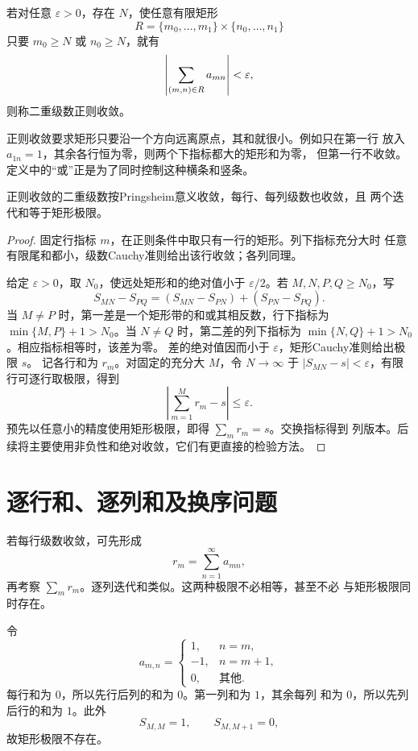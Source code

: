 \begin{definition}[正则收敛]
\label{def:double-series-regular}
若对任意 \(\varepsilon>0\)，存在 \(N\)，使任意有限矩形
\[
 R=\{m_0,\ldots,m_1\}\times\{n_0,\ldots,n_1\}
\]
只要 \(m_0\ge N\) 或 \(n_0\ge N\)，就有
\[
 \left|\sum_{(m,n)\in R}a_{mn}\right|<\varepsilon,
\]
则称二重级数正则收敛。
\end{definition}

正则收敛要求矩形只要沿一个方向远离原点，其和就很小。例如只在第一行
放入 \(a_{1n}=1\)，其余各行恒为零，则两个下指标都大的矩形和为零，
但第一行不收敛。定义中的“或”正是为了同时控制这种横条和竖条。

\begin{proposition}[正则收敛的迭代和]
\label{prop:regular-double-series-iterated}
正则收敛的二重级数按Pringsheim意义收敛，每行、每列级数也收敛，且
两个迭代和等于矩形极限。
\end{proposition}

\begin{proof}
固定行指标 \(m\)，在正则条件中取只有一行的矩形。列下指标充分大时
任意有限尾和都小，级数Cauchy准则给出该行收敛；各列同理。

给定 \(\varepsilon>0\)，取 \(N_0\)，使远处矩形和的绝对值小于
\(\varepsilon/2\)。若 \(M,N,P,Q\ge N_0\)，写
\[
 S_{MN}-S_{PQ}=(S_{MN}-S_{PN})+(S_{PN}-S_{PQ}).
\]
当 \(M\ne P\) 时，第一差是一个矩形带的和或其相反数，行下指标为
\(\min\{M,P\}+1>N_0\)。当 \(N\ne Q\) 时，第二差的列下指标为
\(\min\{N,Q\}+1>N_0\)。相应指标相等时，该差为零。
差的绝对值因而小于 \(\varepsilon\)，矩形Cauchy准则给出极限 \(s\)。
记各行和为 \(r_m\)。对固定的充分大 \(M\)，令 \(N\to\infty\)
于 \(|S_{MN}-s|<\varepsilon\)，有限行可逐行取极限，得到
\[
 \left|\sum_{m=1}^M r_m-s\right|\le\varepsilon.
\]
预先以任意小的精度使用矩形极限，即得 \(\sum_mr_m=s\)。交换指标得到
列版本。后续将主要使用非负性和绝对收敛，它们有更直接的检验方法。
\end{proof}

\section{逐行和、逐列和及换序问题}

若每行级数收敛，可先形成
\[
 r_m=\sum_{n=1}^\infty a_{mn},
\]
再考察 \(\sum_m r_m\)。逐列迭代和类似。这两种极限不必相等，甚至不必
与矩形极限同时存在。

\begin{counterexample}[两种迭代和不同]
\label{ex:double-series-order-counterexample}
令
\[
 a_{m,n}=
 \begin{cases}
 1,&n=m,\\
 -1,&n=m+1,\\
 0,&\text{其他}.
 \end{cases}
\]
每行和为 \(0\)，所以先行后列的和为 \(0\)。第一列和为 \(1\)，其余每列
和为 \(0\)，所以先列后行的和为 \(1\)。此外
\[
 S_{M,M}=1,\qquad S_{M,M+1}=0,
\]
故矩形极限不存在。
\end{counterexample}

